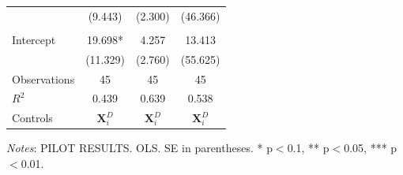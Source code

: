 \documentclass[11pt]{article}
\begin{document}
\begin{table}[!htbp]
\begin{threeparttable}
\begin{tabular}{l|ccc}
 & (9.443) & (2.300) & (46.366) \\
\\[0.5em]
Intercept & 19.698* & 4.257 & 13.413 \\
 & (11.329) & (2.760) & (55.625) \\
\midrule
Observations & 45 & 45 & 45 \\
$R^2$ & 0.439 & 0.639 & 0.538 \\
Controls & $\mathbf{X}_{i}^{D}$ & $\mathbf{X}_{i}^{D}$ & $\mathbf{X}_{i}^{D}$ \\
\bottomrule
\end{tabular}
\begin{tablenotes}[flushleft]
\footnotesize
\item \textit{Notes}: PILOT RESULTS. OLS. SE in parentheses. * p$<$0.1, ** p$<$0.05, *** p$<$0.01.
\end{tablenotes}
\end{threeparttable}
\end{table}
\end{document}
